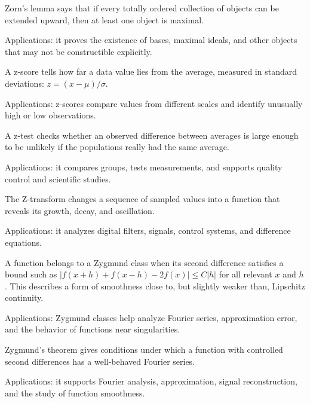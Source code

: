 Zorn's lemma says that if every totally ordered collection of objects can be extended upward, then at least one object is maximal. \par\noindent Applications: it proves the existence of bases, maximal ideals, and other objects that may not be constructible explicitly.

A z-score tells how far a data value lies from the average, measured in standard deviations: $z=(x-\mu)/\sigma$. \par\noindent Applications: z-scores compare values from different scales and identify unusually high or low observations.

A z-test checks whether an observed difference between averages is large enough to be unlikely if the populations really had the same average. \par\noindent Applications: it compares groups, tests measurements, and supports quality control and scientific studies.

The Z-transform changes a sequence of sampled values into a function that reveals its growth, decay, and oscillation. \par\noindent Applications: it analyzes digital filters, signals, control systems, and difference equations.

A function belongs to a Zygmund class when its second difference satisfies a bound such as $|f(x+h)+f(x-h)-2f(x)|\le C|h|$ for all relevant $x$ and $h$. This describes a form of smoothness close to, but slightly weaker than, Lipschitz continuity. \par\noindent Applications: Zygmund classes help analyze Fourier series, approximation error, and the behavior of functions near singularities.

Zygmund's theorem gives conditions under which a function with controlled second differences has a well-behaved Fourier series. \par\noindent Applications: it supports Fourier analysis, approximation, signal reconstruction, and the study of function smoothness.


